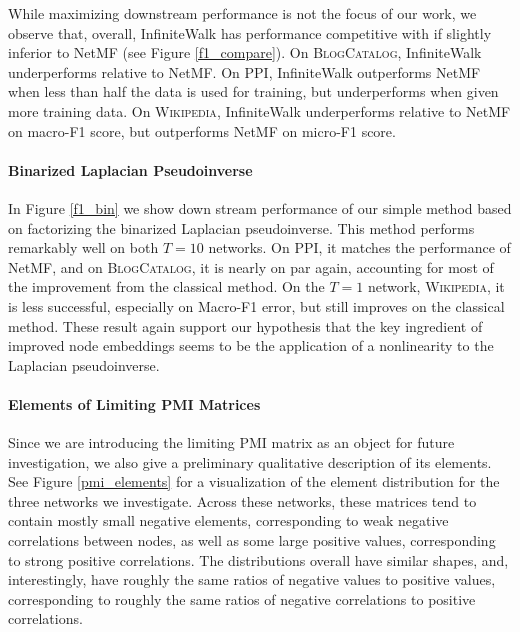 \documentclass[sigconf]{acmart}
\begin{document}
While maximizing downstream performance is not the focus of our work, we observe that, overall, InfiniteWalk has performance competitive with if slightly inferior to NetMF (see Figure \ref{f1_compare}). On \textsc{BlogCatalog}, InfiniteWalk underperforms relative to NetMF. On \textsc{PPI}, InfiniteWalk outperforms NetMF when less than half the data is used for training, but underperforms when given more training data. On \textsc{Wikipedia}, InfiniteWalk underperforms relative to NetMF on macro-F1 score, but outperforms NetMF on micro-F1 score.

\paragraph{Binarized Laplacian Pseudoinverse}
In Figure \ref{f1_bin} we show down stream performance of our simple method based on factorizing the binarized Laplacian pseudoinverse. This method performs remarkably well on both $T=10$ networks. On \textsc{PPI}, it matches the performance of NetMF, and on \textsc{BlogCatalog}, it is nearly on par again, accounting for most of the improvement from the classical method. On the $T=1$ network, \textsc{Wikipedia},
it is less successful, 
especially on Macro-F1 error, but still improves on the classical method. These result again support our hypothesis that the key ingredient of improved node embeddings seems to be the application of a nonlinearity to the Laplacian pseudoinverse.


\paragraph{Elements of Limiting PMI Matrices}
Since we are introducing the limiting PMI matrix as an object for future investigation, we also give a preliminary qualitative description of its elements. See Figure \ref{pmi_elements} for a visualization of the element distribution for the three networks we investigate. Across these networks, these matrices tend to contain mostly small negative elements, corresponding to weak negative correlations between nodes, as well as some large positive values, corresponding to strong positive correlations. The distributions overall have similar shapes, and, interestingly, have roughly the same ratios of negative values to positive values, corresponding to roughly the same ratios of negative correlations to positive correlations.
\end{document}
